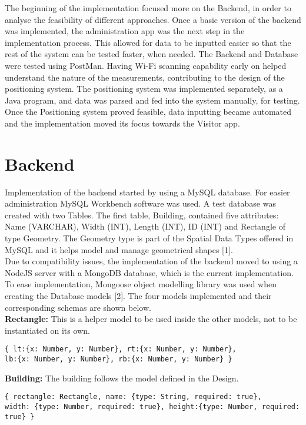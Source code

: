 The beginning of the implementation focused more on the Backend, in order to analyse the feasibility of different approaches. Once a basic version of the backend was implemented, the administration app was the next step in the implementation process. This allowed for data to be inputted easier so that the rest of the system can be tested faster, when needed. The Backend and Database were tested using PostMan. Having Wi-Fi scanning capability early on helped understand the nature of the measurements, contributing to the design of the positioning system. The positioning system was implemented separately, as a Java program, and data was parsed and fed into the system manually, for testing. Once the Positioning system proved feasible, data inputting became automated and the implementation moved its focus towards the Visitor app.

\section{Backend}
Implementation of the backend started by using a MySQL database. For easier administration MySQL Workbench software was used. A test database was created with two Tables. The first table, Building, contained five attributes: Name (VARCHAR), Width (INT), Length (INT), ID (INT) and Rectangle of type Geometry. The Geometry type is part of the Spatial Data Types offered in MySQL and it helps model and manage geometrical shapes [1].
\\
Due to compatibility issues, the implementation of the backend moved to using a NodeJS server with a MongoDB database, which is the current implementation.
To ease implementation, Mongoose object modelling library was used when creating the Database models [2]. The four models implemented and their corresponding schemas are shown below. 
\\
\textbf{Rectangle:}
This is a helper model to be used inside the other models, not to be instantiated on its own.
\begin{lstlisting}
{ lt:{x: Number, y: Number}, rt:{x: Number, y: Number}, 
lb:{x: Number, y: Number}, rb:{x: Number, y: Number} }	
\end{lstlisting}

\noindent
\textbf{Building:}
The building follows the model defined in the Design. 
\begin{lstlisting}
{ rectangle: Rectangle, name: {type: String, required: true},
width: {type: Number, required: true}, height:{type: Number, required: true} }
\end{lstlisting}

